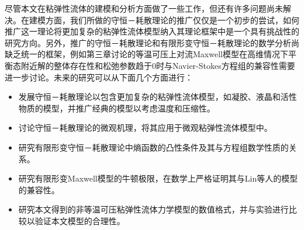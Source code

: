 尽管本文在粘弹性流体的建模和分析方面做了一些工作，但还有许多问题尚未解决。在建模方面，我们所做的守恒－耗散理论的推广仅仅是一个初步的尝试，如何推广这一理论将更加复杂的粘弹性流体模型纳入其理论框架中是一个具有挑战性的研究方向。另外，推广的守恒－耗散理论和有限形变守恒－耗散理论的数学分析尚缺乏统一的框架，例如第三章讨论的等温可压上对流Maxwell模型在高维情况下平衡态附近解的整体存在性和松弛参数趋于$0$时与Navier-Stokes方程组的兼容性需要进一步讨论。未来的研究可以从下面几个方面进行：
\begin{itemize}
	\item 发展守恒－耗散理论以包含更加复杂的粘弹性流体模型，如凝胶、液晶和活性物质的模型，并推广经典的模型以考虑温度和压缩性。
	\item 讨论守恒－耗散理论的微观机理，将其应用于微观粘弹性流体模型中。
	\item 研究有限形变守恒－耗散理论中熵函数的凸性条件及其与方程组数学性质的关系。
	\item 研究有限形变Maxwell模型的牛顿极限，在数学上严格证明其与Lin等人的模型的兼容性。	
	\item 研究本文得到的非等温可压粘弹性流体力学模型的数值格式，并与实验进行比较以验证本文模型的合理性。
\end{itemize}

% 